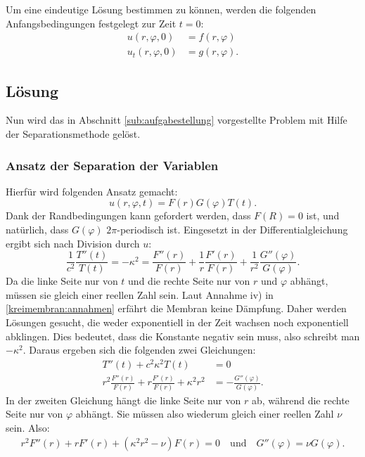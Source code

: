 Um eine eindeutige Lösung bestimmen zu können, werden die folgenden Anfangsbedingungen festgelegt zur Zeit $t = \text{0}$:
\begin{align*}
	u(r,\varphi, 0) &= f(r,\varphi)\\
	u_t(r,\varphi, 0) &= g(r,\varphi).
\end{align*}

\subsection{Lösung\label{sub:lösung1}}
Nun wird das in Abschnitt \ref{sub:aufgabestellung} vorgestellte Problem mit Hilfe der Separationsmethode gelöst.
\subsubsection{Ansatz der Separation der Variablen\label{subsub:ansatz_separation}}
%
Hierfür wird folgenden Ansatz gemacht:
\begin{equation*}
	u(r,\varphi, t) = F(r)G(\varphi)T(t).
\end{equation*}
Dank der Randbedingungen kann gefordert werden, dass $F(R)=0$ ist, und natürlich, dass $G(\varphi)$ $2\pi$-periodisch ist. Eingesetzt in der Differentialgleichung ergibt sich nach Division durch $u$:
\begin{equation*}
	\frac{1}{c^2}\frac{T''(t)}{T(t)}=-\kappa^2=\frac{F''(r)}{F(r)}+\frac{1}{r}\frac{F'(r)}{F(r)}+\frac{1}{r^2}\frac{G''(\varphi)}{G(\varphi)}.
\end{equation*}
Da die linke Seite nur von $t$ und die rechte Seite nur von $r$ und $\varphi$ abhängt, müssen sie gleich einer reellen Zahl sein. 
Laut Annahme iv) in \ref{kreimembran:annahmen} erfährt die Membran keine Dämpfung.
Daher werden Lösungen gesucht, die weder exponentiell in der Zeit wachsen noch exponentiell abklingen. 
Dies bedeutet, dass die Konstante negativ sein muss, also schreibt man $-\kappa^2$. Daraus ergeben sich die folgenden zwei Gleichungen:
\begin{align*}
	T''(t) + c^2\kappa^2T(t) &= 0\\
	r^2\frac{F''(r)}{F(r)} + r \frac{F'(r)}{F(r)} +\kappa^2 r^2 &= - \frac{G''(\varphi)}{G(\varphi)}.
\end{align*}
In der zweiten Gleichung hängt die linke Seite nur von $r$ ab, während die rechte Seite nur von $\varphi$ abhängt. Sie müssen also wiederum gleich einer reellen Zahl $\nu$ sein. Also:
\begin{align*}
	r^2F''(r) + rF'(r) + (\kappa^2 r^2 - \nu)F(r) = 0 \quad \text{und} \quad
	G''(\varphi) = \nu G(\varphi).
\end{align*}

